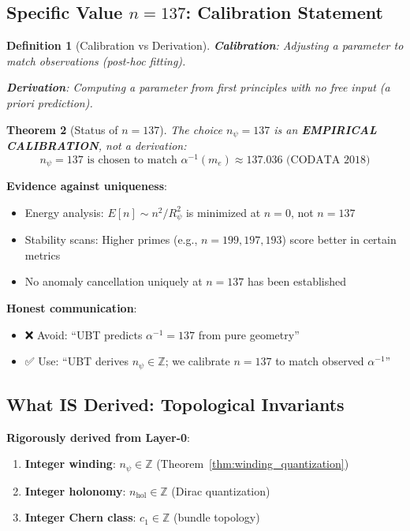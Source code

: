 \documentclass[12pt]{article}
\newtheorem{definition}{Definition}[section]
\newtheorem{theorem}[definition]{Theorem}
\newcommand{\Z}{\mathbb{Z}}
\begin{document}
\subsection{Specific Value $n=137$: Calibration Statement}

\begin{definition}[Calibration vs Derivation]
\textbf{Calibration}: Adjusting a parameter to match observations (post-hoc fitting).

\textbf{Derivation}: Computing a parameter from first principles with no free input (a priori prediction).
\end{definition}

\begin{theorem}[Status of $n=137$]
The choice $n_\psi = 137$ is an \textbf{EMPIRICAL CALIBRATION}, not a derivation:
\begin{equation}
n_\psi = 137 \text{ is chosen to match } \alpha^{-1}(m_e) \approx 137.036 \text{ (CODATA 2018)}
\end{equation}
\end{theorem}

\textbf{Evidence against uniqueness}:
\begin{itemize}
    \item Energy analysis: $E[n] \sim n^2/R_\psi^2$ is minimized at $n=0$, not $n=137$
    \item Stability scans: Higher primes (e.g., $n=199, 197, 193$) score better in certain metrics
    \item No anomaly cancellation uniquely at $n=137$ has been established
\end{itemize}

\textbf{Honest communication}:
\begin{itemize}
    \item ❌ Avoid: ``UBT predicts $\alpha^{-1} = 137$ from pure geometry''
    \item ✅ Use: ``UBT derives $n_\psi \in \Z$; we calibrate $n=137$ to match observed $\alpha^{-1}$''
\end{itemize}

\subsection{What IS Derived: Topological Invariants}

\textbf{Rigorously derived from Layer-0}:
\begin{enumerate}
    \item \textbf{Integer winding}: $n_\psi \in \Z$ (Theorem~\ref{thm:winding_quantization})
    \item \textbf{Integer holonomy}: $n_{\text{hol}} \in \Z$ (Dirac quantization)
    \item \textbf{Integer Chern class}: $c_1 \in \Z$ (bundle topology)
\end{enumerate}
\end{document}
